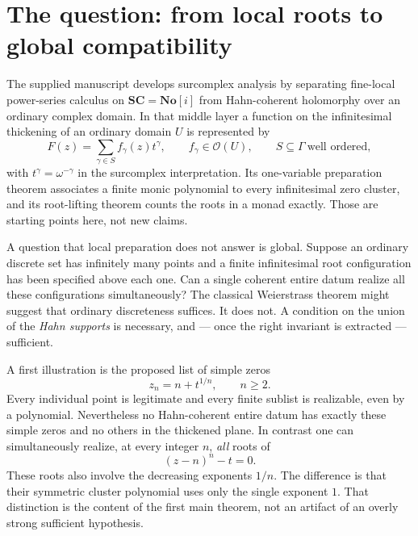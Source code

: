 \documentclass[11pt,letterpaper]{article}
\theoremstyle{definition}
\theoremstyle{remark}
\newcommand{\No}{\mathbf{No}}
\newcommand{\SC}{\mathbf{SC}}
\newcommand{\OO}{\mathcal O}
\numberwithin{equation}{section}
\begin{document}
\section{The question: from local roots to global compatibility}\label{global:sec:intro}

The supplied manuscript \cite{Source} develops surcomplex analysis by separating fine-local power-series calculus on $\SC=\No[i]$ from Hahn-coherent holomorphy over an ordinary complex domain. In that middle layer a function on the infinitesimal thickening of an ordinary domain $U$ is represented by
\[
  F(z)=\sum_{\gamma\in S}f_\gamma(z)t^\gamma,
  \qquad f_\gamma\in\OO(U),\qquad S\subseteq\Gamma\ \text{well ordered},
\]
with $t^\gamma=\omega^{-\gamma}$ in the surcomplex interpretation. Its one-variable preparation theorem associates a finite monic polynomial to every infinitesimal zero cluster, and its root-lifting theorem counts the roots in a monad exactly. Those are starting points here, not new claims.

A question that local preparation does not answer is global. Suppose an ordinary discrete set has infinitely many points and a finite infinitesimal root configuration has been specified above each one. Can a single coherent entire datum realize all these configurations simultaneously? The classical Weierstrass theorem might suggest that ordinary discreteness suffices. It does not. A condition on the union of the \emph{Hahn supports} is necessary, and --- once the right invariant is extracted --- sufficient.

A first illustration is the proposed list of simple zeros
\begin{equation}\label{global:eq:impossibleintro}
  z_n=n+t^{1/n},\qquad n\ge2 .
\end{equation}
Every individual point is legitimate and every finite sublist is realizable, even by a polynomial. Nevertheless no Hahn-coherent entire datum has exactly these simple zeros and no others in the thickened plane. In contrast one can simultaneously realize, at every integer $n$, \emph{all} roots of
\begin{equation}\label{global:eq:possibleintro}
  (z-n)^n-t=0 .
\end{equation}
These roots also involve the decreasing exponents $1/n$. The difference is that their symmetric cluster polynomial uses only the single exponent $1$. That distinction is the content of the first main theorem, not an artifact of an overly strong sufficient hypothesis.
\end{document}

